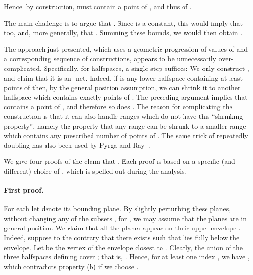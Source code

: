 \documentclass[12pt]{article}
\begin{document}
Hence, by construction,  must contain a point of ,
and thus of .

The main challenge is to argue that .
Since  is a constant, this would imply that
 too, and, more generally, that
. Summing these bounds, we would
then obtain .

\medskip

The approach just presented, which uses a geometric progression of
values of  and a corresponding sequence of constructions,
appears to be unnecessarily over-complicated.  Specifically, for
halfspaces, a single step suffices: We only construct , and
claim that it is an -net. Indeed, if  is any lower halfspace
containing at least  points of  then, by the general position 
assumption, we can shrink it to
another halfspace  which contains exactly 
points of . The preceding argument implies that  contains a
point of , and therefore so does . The reason for
complicating the construction is that it can also handle ranges which
do not have this ``shrinking property'', namely the property that any
range can be shrunk to a smaller range which contains any prescribed
number of points of .  The same trick of repeatedly doubling 
has also been used by Pyrga and Ray~\cite{pr-nepen-08}.

\medskip

We give four proofs of the claim that .
Each proof is based on a specific (and different) choice of ,
which is spelled out during the analysis.

\paragraph{First proof.}
For each  let  denote its bounding plane.
By slightly perturbing these planes, without changing any of the
subsets , for , we may assume that the planes 
are in general position. We claim
that all the planes  appear on their upper envelope
. Indeed, suppose to the contrary that there exists  such
that  lies fully below the envelope.
Let  be the vertex of the envelope closest to .
Clearly, the union of the three halfspaces 
defining  cover ; that is, .
Hence, for at least one index , we have
,
which contradicts property (b) if we choose .
\end{document}
